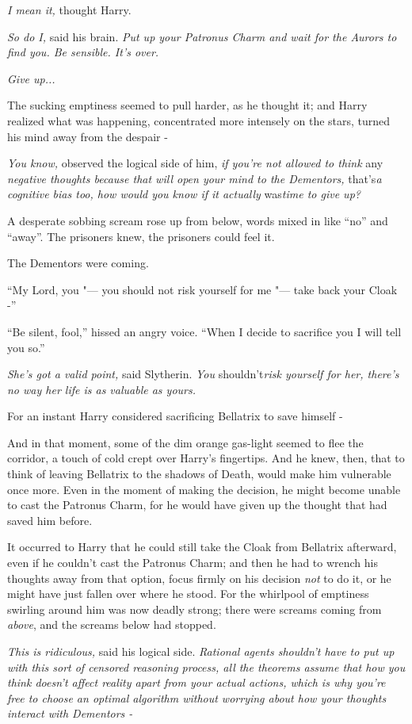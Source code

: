 \emph{I mean it,} thought Harry.

\emph{So do I,} said his brain. \emph{Put up your Patronus Charm and
wait for the Aurors to find you. Be sensible. It's over.}

\emph{Give up...}

The sucking emptiness seemed to pull harder, as he thought it; and Harry
realized what was happening, concentrated more intensely on the stars,
turned his mind away from the despair -

\emph{You know,} observed the logical side of him, \emph{if you're not
allowed to think} any \emph{negative thoughts because that will open
your mind to the Dementors,} that's\emph{a cognitive bias too, how would
you know if it actually} was\emph{time to give up?}

A desperate sobbing scream rose up from below, words mixed in like
``no'' and ``away''. The prisoners knew, the prisoners could feel it.

The Dementors were coming.

``My Lord, you "--- you should not risk yourself for me "--- take back your
Cloak -''

``Be silent, fool,'' hissed an angry voice. ``When I decide to sacrifice
you I will tell you so.''

\emph{She's got a valid point,} said Slytherin. \emph{You}
shouldn't\emph{risk yourself for her, there's no way her life is as
valuable as yours.}

For an instant Harry considered sacrificing Bellatrix to save himself -

And in that moment, some of the dim orange gas-light seemed to flee the
corridor, a touch of cold crept over Harry's fingertips. And he knew,
then, that to think of leaving Bellatrix to the shadows of Death, would
make him vulnerable once more. Even in the moment of making the
decision, he might become unable to cast the Patronus Charm, for he
would have given up the thought that had saved him before.

It occurred to Harry that he could still take the Cloak from Bellatrix
afterward, even if he couldn't cast the Patronus Charm; and then he had
to wrench his thoughts away from that option, focus firmly on his
decision \emph{not} to do it, or he might have just fallen over where he
stood. For the whirlpool of emptiness swirling around him was now deadly
strong; there were screams coming from \emph{above}, and the screams
below had stopped.

\emph{This is ridiculous,} said his logical side. \emph{Rational agents
shouldn't have to put up with this sort of censored reasoning process,
all the theorems assume that how you think doesn't affect reality apart
from your actual actions, which is why you're free to choose an optimal
algorithm without worrying about how your thoughts interact with
Dementors -}

